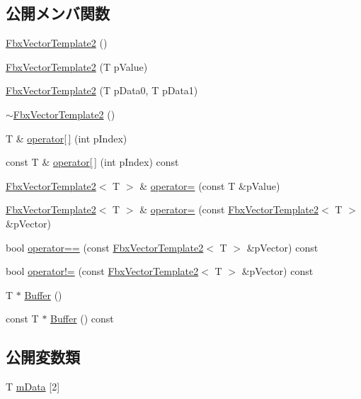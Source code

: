 \subsection*{公開メンバ関数}
\begin{DoxyCompactItemize}
\item 
\hyperlink{class_fbx_vector_template2_a5ed1ade2c2a43c5a5369072a9bde87b4}{Fbx\+Vector\+Template2} ()
\item 
\hyperlink{class_fbx_vector_template2_a261d0bfc0f191c9908b176909484d7a9}{Fbx\+Vector\+Template2} (T p\+Value)
\item 
\hyperlink{class_fbx_vector_template2_ab7f314b07663cf74dc1dc638d1b6502d}{Fbx\+Vector\+Template2} (T p\+Data0, T p\+Data1)
\item 
\hyperlink{class_fbx_vector_template2_a408867e7a66b93c809934cc39109d3f9}{$\sim$\+Fbx\+Vector\+Template2} ()
\item 
T \& \hyperlink{class_fbx_vector_template2_a51038dd841fd61f144304acbf26c2eb9}{operator\mbox{[}$\,$\mbox{]}} (int p\+Index)
\item 
const T \& \hyperlink{class_fbx_vector_template2_a87dc10a49d55552616bafa4f6bca26fa}{operator\mbox{[}$\,$\mbox{]}} (int p\+Index) const
\item 
\hyperlink{class_fbx_vector_template2}{Fbx\+Vector\+Template2}$<$ T $>$ \& \hyperlink{class_fbx_vector_template2_ad30461b620c236ca3914e078aa3a74a9}{operator=} (const T \&p\+Value)
\item 
\hyperlink{class_fbx_vector_template2}{Fbx\+Vector\+Template2}$<$ T $>$ \& \hyperlink{class_fbx_vector_template2_acc052cfaef7530489fdc47ffea2ed78e}{operator=} (const \hyperlink{class_fbx_vector_template2}{Fbx\+Vector\+Template2}$<$ T $>$ \&p\+Vector)
\item 
bool \hyperlink{class_fbx_vector_template2_ad9921dfc627c8fba190e708555d21c84}{operator==} (const \hyperlink{class_fbx_vector_template2}{Fbx\+Vector\+Template2}$<$ T $>$ \&p\+Vector) const
\item 
bool \hyperlink{class_fbx_vector_template2_a892290b45c2afa593e89c8c8ee7ab51d}{operator!=} (const \hyperlink{class_fbx_vector_template2}{Fbx\+Vector\+Template2}$<$ T $>$ \&p\+Vector) const
\item 
T $\ast$ \hyperlink{class_fbx_vector_template2_a117a7f35111300b865b648e46b18dcdd}{Buffer} ()
\item 
const T $\ast$ \hyperlink{class_fbx_vector_template2_a804f4c622838c2bbef16fb6878033741}{Buffer} () const
\end{DoxyCompactItemize}
\subsection*{公開変数類}
\begin{DoxyCompactItemize}
\item 
T \hyperlink{class_fbx_vector_template2_a3d09e5eba5b2bde333e4ebd3206c5727}{m\+Data} \mbox{[}2\mbox{]}
\end{DoxyCompactItemize}


